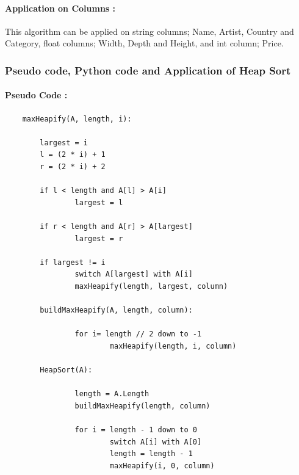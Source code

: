 \documentclass[12pt]{article}
\begin{document}
    \paragraph{Application on Columns :} 
    This algorithm can be applied on string columns; Name, Artist, Country and Category, float columns; Width, Depth and Height, and int column; Price.
    
    \newpage
    \subsubsection{Pseudo code, Python code and Application of Heap Sort}
    \paragraph{Pseudo Code :}
    \begin{verbatim}
    maxHeapify(A, length, i):

        largest = i
        l = (2 * i) + 1
        r = (2 * i) + 2

        if l < length and A[l] > A[i]
                largest = l

        if r < length and A[r] > A[largest]
                largest = r

        if largest != i
                switch A[largest] with A[i]
                maxHeapify(length, largest, column)

        buildMaxHeapify(A, length, column):
        
                for i= length // 2 down to -1
                        maxHeapify(length, i, column)
        
        HeapSort(A):
        
                length = A.Length
                buildMaxHeapify(length, column)
        
                for i = length - 1 down to 0
                        switch A[i] with A[0]
                        length = length - 1
                        maxHeapify(i, 0, column)
    \end{verbatim}
\end{document}
